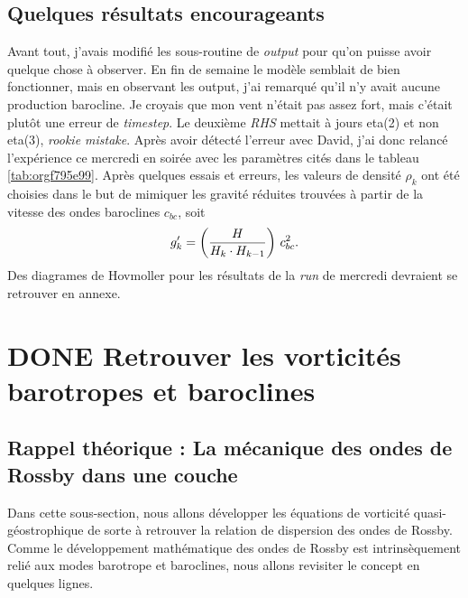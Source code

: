 \documentclass[10pt]{article}
\numberwithin{equation}{section}
\begin{document}
\subsection{Quelques résultats encourageants}
\label{sec:org47364b6}
Avant tout, j'avais modifié les sous-routine de \emph{output} pour qu'on puisse avoir quelque chose à observer.
En fin de semaine le modèle semblait de bien fonctionner, mais en observant les output, j'ai remarqué qu'il n'y avait aucune production barocline.
Je croyais que mon vent n'était pas assez fort, mais c'était plutôt une erreur de \emph{timestep}.
Le deuxième \emph{RHS} mettait à jours eta(2) et non eta(3), \emph{rookie mistake}.
Après avoir détecté l'erreur avec David, j'ai donc relancé l'expérience ce mercredi en soirée avec les paramètres cités dans le tableau \ref{tab:orgf795e99}.
Après quelques essais et erreurs, les valeurs de densité \(\rho_k\) ont été choisies dans le but de mimiquer les gravité réduites trouvées à partir de la vitesse des ondes baroclines \(c_{bc}\), soit
\begin{equation}
g_k' = \qty(\frac{H}{H_k\cdot H_{k-1}}) \ c_{bc}^2.
\end{equation}
Des diagrames de Hovmoller pour les résultats de la \emph{run} de mercredi devraient se retrouver en annexe.
\section{{\bfseries\sffamily DONE} Retrouver les vorticités barotropes et baroclines}
\label{sec:orgdea6970}
\subsection{\textbf{Rappel théorique} :  La mécanique des ondes de Rossby dans une couche}
\label{sec:orgb5701e4}
Dans cette sous-section, nous allons développer les équations de vorticité quasi-géostrophique de sorte à retrouver la relation de dispersion des ondes de Rossby.
Comme le développement mathématique des ondes de Rossby est intrinsèquement relié aux modes barotrope et baroclines, nous allons revisiter le concept en quelques lignes.\bigskip
\end{document}
